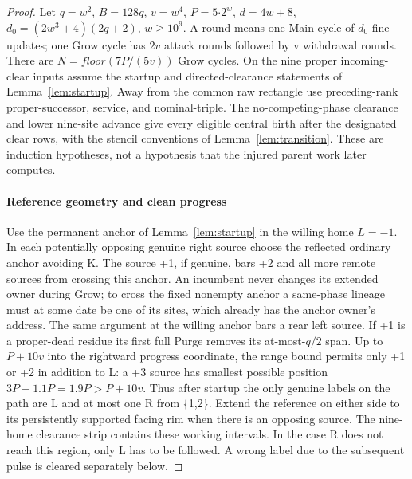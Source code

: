 \begin{proof}
Let \(q=w^{2}\), \(B=128q\), \(v=w^{4}\), \(P=5\)\(\cdot\)\(2^w\), \(d=4w+8\), \(d_0=(2w^{3}+4)(2q+2)\), \(w\ge 10^9\). A round means one Main cycle of \(d_0\) fine updates; one Grow cycle has \(2v\) attack rounds followed by v withdrawal rounds. There are \(N=floor(7P/(5v))\) Grow cycles. On the nine proper incoming-clear inputs assume the startup and directed-clearance statements of Lemma~\ref{lem:startup}. Away from the common raw rectangle use preceding-rank proper-successor, service, and nominal-triple. The no-competing-phase clearance and lower nine-site advance give every eligible central birth after the designated clear rows, with the stencil conventions of Lemma~\ref{lem:transition}. These are induction hypotheses, not a hypothesis that the injured parent work later computes.



\paragraph{Reference geometry and clean progress}

Use the permanent anchor of Lemma~\ref{lem:startup} in the willing home \(L=- 1\). In each potentially opposing genuine right source choose the reflected ordinary anchor avoiding K. The source +1, if genuine, bars +2 and all more remote sources from crossing this anchor. An incumbent never changes its extended owner during Grow; to cross the fixed nonempty anchor a same-phase lineage must at some date be one of its sites, which already has the anchor owner's address. The same argument at the willing anchor bars a rear left source. If +1 is a proper-dead residue its first full Purge removes its at-most-\(q/2\) span. Up to \(P+10v\) into the rightward progress coordinate, the range bound permits only +1 or +2 in addition to L: a +3 source has smallest possible position \(3P- 1.1P=1.9P>P+10v\). Thus after startup the only genuine labels on the path are L and at most one R from \{1,2\}. Extend the reference on either side to its persistently supported facing rim when there is an opposing source. The nine-home clearance strip contains these working intervals. In the case R does not reach this region, only L has to be followed. A wrong label due to the subsequent pulse is cleared separately below.


\end{proof}
